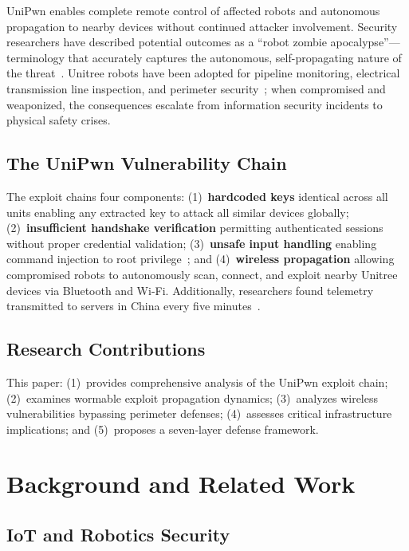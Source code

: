 \documentclass[journal]{IEEEtran}
\begin{document}
UniPwn enables complete remote control of affected robots and autonomous propagation to
nearby devices without continued attacker involvement. Security researchers have described
potential outcomes as a ``robot zombie apocalypse''---terminology that accurately captures
the autonomous, self-propagating nature of the threat~\cite{naraine2025hackers}. Unitree
robots have been adopted for pipeline monitoring, electrical transmission line inspection,
and perimeter security~\cite{gosavi2025unitree}; when compromised and weaponized, the
consequences escalate from information security incidents to physical safety crises.

\subsection{The UniPwn Vulnerability Chain}

The exploit chains four components: (1)~\textbf{hardcoded keys} identical across all
units enabling any extracted key to attack all similar devices globally;
(2)~\textbf{insufficient handshake verification} permitting authenticated sessions without
proper credential validation; (3)~\textbf{unsafe input handling} enabling command
injection to root privilege~\cite{udinmwen2025calm}; and (4)~\textbf{wireless propagation}
allowing compromised robots to autonomously scan, connect, and exploit nearby Unitree
devices via Bluetooth and Wi-Fi. Additionally, researchers found telemetry transmitted to
servers in China every five minutes~\cite{gosavi2025unitree}.

\subsection{Research Contributions}

This paper: (1)~provides comprehensive analysis of the UniPwn exploit chain;
(2)~examines wormable exploit propagation dynamics; (3)~analyzes wireless vulnerabilities
bypassing perimeter defenses; (4)~assesses critical infrastructure implications; and
(5)~proposes a seven-layer defense framework.

\section{Background and Related Work}

\subsection{IoT and Robotics Security}
\end{document}
